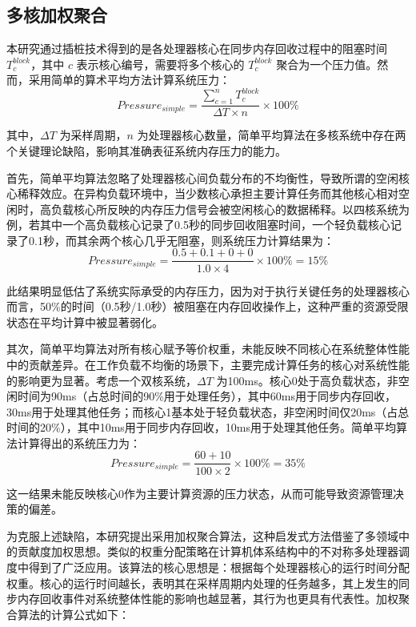 \subsection{多核加权聚合}
\label{sec:weighted_aggregation}
本研究通过插桩技术得到的是各处理器核心在同步内存回收过程中的阻塞时间 \(T_c^{block}\)，其中 \(c\) 表示核心编号，需要将多个核心的 \(T_c^{block}\) 聚合为一个压力值。然而，采用简单的算术平均方法计算系统压力：
\begin{equation}
    \label{eq:simple_average_pressure}
    Pressure_{simple} = \frac{\sum_{c=1}^{n} T_c^{block}}{\Delta T \times n} \times 100\%
\end{equation}

其中，\(\Delta T\) 为采样周期，\(n\) 为处理器核心数量，简单平均算法在多核系统中存在两个关键理论缺陷，影响其准确表征系统内存压力的能力。

首先，简单平均算法忽略了处理器核心间负载分布的不均衡性，导致所谓的空闲核心稀释效应。在异构负载环境中，当少数核心承担主要计算任务而其他核心相对空闲时，高负载核心所反映的内存压力信号会被空闲核心的数据稀释。以四核系统为例，若其中一个高负载核心记录了0.5秒的同步回收阻塞时间，一个轻负载核心记录了0.1秒，而其余两个核心几乎无阻塞，则系统压力计算结果为：
\[
Pressure_{simple} = \frac{0.5 + 0.1 + 0 + 0}{1.0 \times 4} \times 100\% = 15\%
\]

此结果明显低估了系统实际承受的内存压力，因为对于执行关键任务的处理器核心而言，50\%的时间（0.5秒/1.0秒）被阻塞在内存回收操作上，这种严重的资源受限状态在平均计算中被显著弱化。

其次，简单平均算法对所有核心赋予等价权重，未能反映不同核心在系统整体性能中的贡献差异。在工作负载不均衡的场景下，主要完成计算任务的核心对系统性能的影响更为显著。考虑一个双核系统，\(\Delta T\) 为100ms。核心0处于高负载状态，非空闲时间为90ms（占总时间的90\%用于处理任务），其中60ms用于同步内存回收，30ms用于处理其他任务；而核心1基本处于轻负载状态，非空闲时间仅20ms（占总时间的20\%），其中10ms用于同步内存回收，10ms用于处理其他任务。简单平均算法计算得出的系统压力为：
\[
Pressure_{simple} = \frac{60 + 10}{100 \times 2} \times 100\% = 35\%
\]

这一结果未能反映核心0作为主要计算资源的压力状态，从而可能导致资源管理决策的偏差。

为克服上述缺陷，本研究提出采用加权聚合算法，这种启发式方法借鉴了多领域中的贡献度加权思想。类似的权重分配策略在计算机体系结构中的不对称多处理器调度中得到了广泛应用。该算法的核心思想是：根据每个处理器核心的运行时间分配权重。核心的运行时间越长，表明其在采样周期内处理的任务越多，其上发生的同步内存回收事件对系统整体性能的影响也越显著，其行为也更具有代表性。加权聚合算法的计算公式如下：

